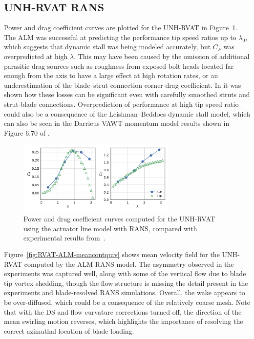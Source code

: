 \documentclass[times]{weauth}
\begin{document}
\subsection{UNH-RVAT RANS}

Power and drag coefficient curves are plotted for the UNH-RVAT in
Figure~\ref{fig:RVAT-ALM-perf-curves}. The ALM was successful at predicting the
performance tip speed ratios up to $\lambda_0$, which suggests that dynamic
stall was being modeled accurately, but $C_P$ was overpredicted at high
$\lambda$. This may have been caused by the omission of additional parasitic
drag sources such as roughness from exposed bolt heads located far enough from
the axis to have a large effect at high rotation rates, or an underestimation of
the blade--strut connection corner drag coefficient. In
\cite{Rawlings2008,Bachant2016-RM2-paper} it was shown how these losses can be
significant even with carefully smoothed struts and strut-blade connections.
Overprediction of performance at high tip speed ratio could also be a
consequence of the Leishman--Beddoes dynamic stall model, which can also be seen
in the Darrieus VAWT momentum model results shown in Figure 6.70 of
\cite{Para2002}.

\begin{figure}
    \centering

    \includegraphics[width=0.7\textwidth]{RVAT-ALM_perf-curves}

    \caption{Power and drag coefficient curves computed for the UNH-RVAT using
        the actuator line model with RANS, compared with experimental results
        from~\cite{Bachant2016-RVAT-Re-dep}.}

    \label{fig:RVAT-ALM-perf-curves}
\end{figure}

Figure~\ref{fig:RVAT-ALM-meancontquiv} shows mean velocity field for the
UNH-RVAT computed by the ALM RANS model. The asymmetry observed in the
experiments \cite{Bachant2015-JoT} was captured well, along with some of the
vertical flow due to blade tip vortex shedding, though the flow structure is
missing the detail present in the experiments and blade-resolved RANS
simulations. Overall, the wake appears to be over-diffused, which could be a
consequence of the relatively coarse mesh. Note that with the DS and flow
curvature corrections turned off, the direction of the mean swirling motion
reverses, which highlights the importance of resolving the correct azimuthal
location of blade loading.
\end{document}
